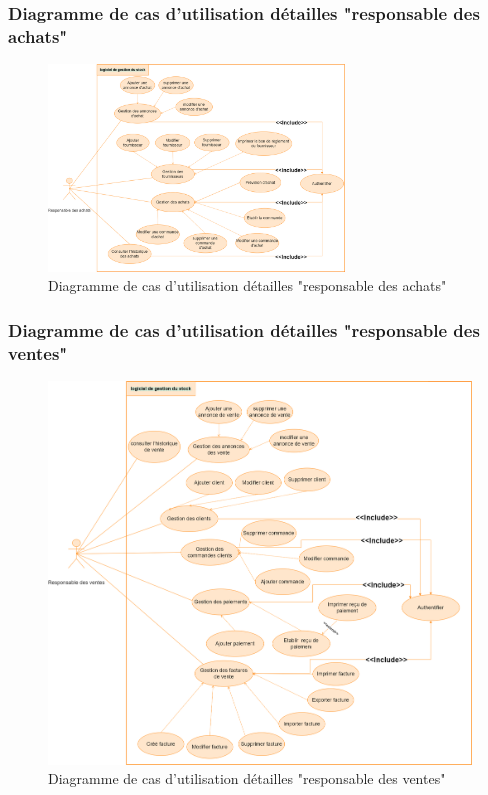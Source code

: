 \documentclass[edit,12pt,a4paper,ChapStyle,oneside,doubleinterligne]{report}
\begin{document}
\subsubsection{Diagramme de cas d'utilisation détailles "responsable des achats" }
\begin{figure}[h!]\label{fig:diagramme de cas d'utilisation détailles "responsable des achats"}
\centering
\includegraphics[width=0.7\textwidth]{images/usecas RA.png}
\caption{Diagramme de cas d'utilisation détailles "responsable des achats"}
\end{figure}
\newpage
\subsubsection{Diagramme de cas d'utilisation détailles "responsable des ventes" }
\begin{figure}[h!]\label{fig:diagramme de cas d'utilisation détailles "responsable des ventes"}
\centering
\includegraphics[width=1\textwidth]{images/usecas RV.png}
\caption{Diagramme de cas d'utilisation détailles "responsable des ventes"}
\end{figure}
\newpage
\end{document}
